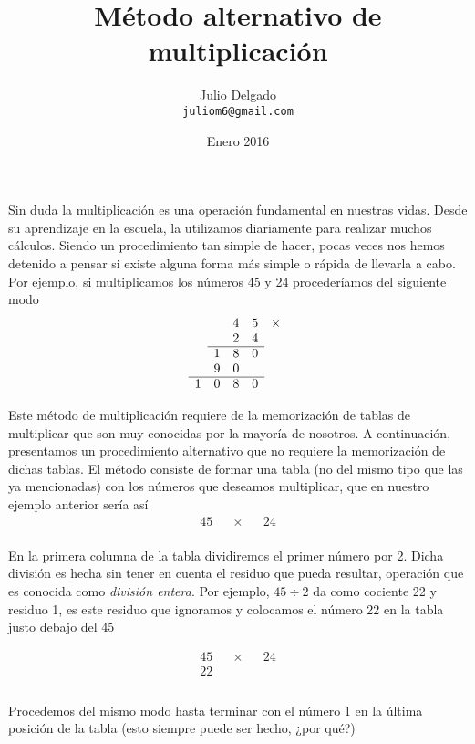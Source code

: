 \documentclass[12pt]{article}
\title{M\'etodo alternativo de multiplicaci\'on}
\author{Julio Delgado\\ {\tt juliom6@gmail.com}}
\date{Enero 2016}
\theoremstyle{definition}
\begin{document}
\maketitle

Sin duda la multiplicaci\'on es una operaci\'on fundamental en nuestras vidas. Desde su aprendizaje en la escuela, la utilizamos diariamente para realizar muchos c\'alculos. Siendo un procedimiento tan simple de hacer, pocas veces nos hemos detenido a pensar si existe alguna forma m\'as simple o r\'apida de llevarla a cabo. Por ejemplo, si multiplicamos los n\'umeros 45 y 24 proceder\'iamos del siguiente modo
\setlength{\arrayrulewidth}{.08em}
\[
\begin{array}{ccccc}
 &  & 4 & 5 & \times\\
 &  & 2 & 4 & \\ \cline{2-4}
 & 1 & 8 & 0 & \\
 & 9 & 0 &  & \\ \cline{1-4}
1 & 0 & 8 & 0 & \\
\end{array}
\]


Este m\'etodo de multiplicaci\'on requiere de la memorizaci\'on de tablas de multiplicar que son muy conocidas por la mayor\'ia de nosotros. A continuaci\'on, presentamos un procedimiento alternativo que no requiere la memorizaci\'on de dichas tablas. El m\'etodo consiste de formar una tabla (no del mismo tipo que las ya mencionadas) con los n\'umeros que deseamos multiplicar, que en nuestro ejemplo anterior ser\'ia as\'i
\[
\begin{array}{rcccr}
45 &  & \times &  & 24 \\
\end{array}
\]

En la primera columna de la tabla dividiremos el primer n\'umero por 2. Dicha divisi\'on es hecha sin tener en cuenta el residuo que pueda resultar, operaci\'on que es conocida como \textit{divisi\'on entera}. Por ejemplo, $45 \div 2$ da como cociente 22 y residuo 1, es este residuo que ignoramos y colocamos el n\'umero 22 en la tabla justo debajo del 45

\[
\begin{array}{rcccr}
45 &  & \times &  & 24 \\
22 &  &        &  &  \\
 &  &        &  &  \\
\end{array}
\]

Procedemos del mismo modo hasta terminar con el n\'umero 1 en la \'ultima posici\'on de la tabla (esto siempre puede ser hecho, ¿por qu\'e?)
\end{document}
